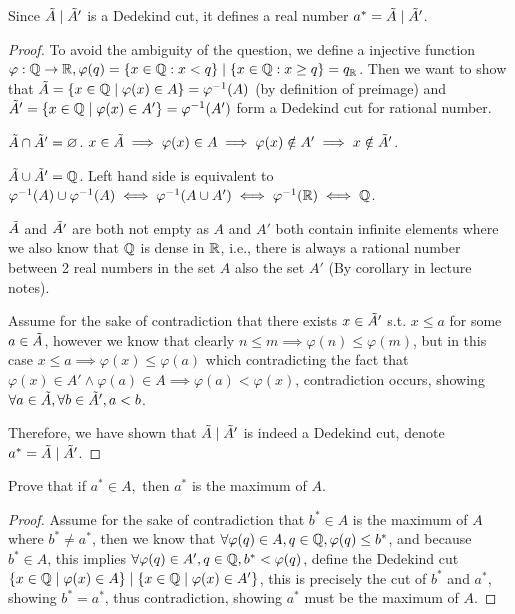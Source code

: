 \documentclass{homework}
\newcommand{\R}{\bb{R}} %
\newcommand{\Q}{\bb{Q}} %
\newcommand{\ra}{\rightarrow}
\newcommand{\?}{\stackrel{?}{=}}
\theoremstyle{definition}
\begin{document}
Since $\Tilde{A}\mid\Tilde{A}'$ is a Dedekind cut, it defines a real number $a^*=\Tilde{A}\mid\Tilde{A}'$.

\begin{proof}
    To avoid the ambiguity of the question, we define a injective function $\varphi:\Q\ra\R, \varphi(q)=\{x\in\Q:x<q\}\mid\{x\in\Q:x\geq q\}=q_\R$. Then we want to show that $\Tilde{A}=\{x\in\Q\mid \varphi(x)\in A\}=\varphi^{-1}(A)$ (by definition of preimage) and $\Tilde{A}'=\{x\in\Q\mid \varphi(x)\in A'\}=\varphi^{-1}(A')$ form a Dedekind cut for rational number. 

    \underline{$\Tilde{A}\cap\Tilde{A}'=\varnothing$}. $x\in\Tilde{A}\implies\varphi(x)\in A\implies \varphi(x)\notin A'\implies x\notin \Tilde{A}'$. 

    \underline{$\Tilde{A}\cup\Tilde{A}'=\Q$}. Left hand side is equivalent to $\varphi^{-1}(A)\cup \varphi^{-1}(A)\iff \varphi^{-1}(A\cup A')\iff \varphi^{-1}(\R)\iff\Q$. 

    $\Tilde{A}$ and $\Tilde{A'}$ are both not empty as $A$ and $A'$ both contain infinite elements where we also know that $\Q$ is dense in $\R$, i.e., there is always a rational number between 2 real numbers in the set $A$ also the set $A'$ (By corollary in lecture notes). 

    Assume for the sake of contradiction that there exists $x\in\Tilde{A}'$ s.t. $x\leq a$ for some $a\in\Tilde{A}$, however we know that clearly $n\leq m\implies\varphi(n)\leq \varphi(m)$, but in this case $x\leq a\implies\varphi(x)\leq \varphi(a)$ which contradicting the fact that $\varphi(x)\in A'\land\varphi(a)\in A\implies \varphi(a)<\varphi(x)$, contradiction occurs, showing $\forall a\in\Tilde{A}, \forall b\in\Tilde{A}', a< b$.

    Therefore, we have shown that $\Tilde{A}\mid\Tilde{A}'$ is indeed a Dedekind cut, denote $a^*=\Tilde{A}\mid\Tilde{A}'$. 
\end{proof}

\question[2] Prove that if $a^*\in A, $ then $a^*$ is the maximum of $A$.
\begin{proof}
    Assume for the sake of contradiction that $b^*\in A$ is the maximum of $A$ where $b^*\neq a^*$, then we know that $\forall \varphi(q)\in A, q\in\Q, \varphi(q)\leq b^*$, and because $b^*\in A$, this implies $\forall\varphi(q)\in A', q\in\Q, b^*<\varphi(q)$, define the Dedekind cut $\{x\in\Q\mid \varphi(x)\in A\}\mid\{x\in\Q\mid \varphi(x)\in A'\}$, this is precisely the cut of $b^*$ and $a^*$, showing $b^*=a^*$, thus contradiction, showing $a^*$ must be the maximum of $A$. 
\end{proof}
\end{document}
